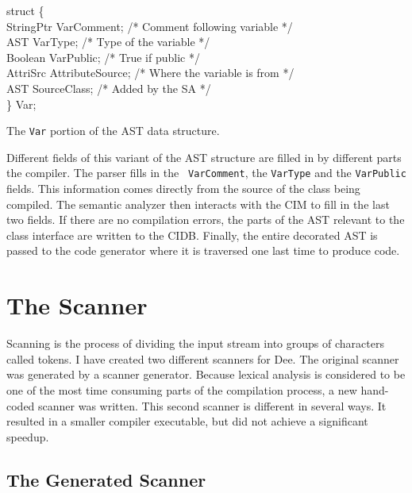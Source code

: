 \begin{shortfigure}
\begin{prog}  
\>      struct \{                     \\                                 
\>\>      StringPtr VarComment;     /* Comment following variable */  \\
\>\>      AST VarType;              /* Type of the variable       */  \\
\>\>      Boolean VarPublic;        /* True if public             */  \\
\>\>      AttriSrc AttributeSource; /* Where the variable is from */  \\
\>\>      AST SourceClass;          /* Added by the SA            */  \\
\>      \} Var;
\end{prog}
\caption{The {\tt Var} portion of the AST data structure.}
\label{fig:var}
\end{shortfigure}

Different fields of this variant of the AST structure are filled in by
different parts the compiler.  The parser fills in the {\tt
VarComment}, the {\tt VarType} and the {\tt VarPublic} fields.  This
information comes directly from the source of the class being
compiled.  The semantic analyzer then interacts with the CIM to fill
in the last two fields.  If there are no compilation errors, the parts
of the AST relevant to the class interface are written to the CIDB.
Finally, the entire decorated AST is passed to the code generator
where it is traversed one last time to produce code.


\section{The Scanner}

Scanning is the process of dividing the input stream into groups of
characters called tokens.  I have created two different scanners for
Dee.  The original scanner was generated by a scanner generator.
Because lexical analysis is considered to be one of the most time
consuming parts of the compilation process, a new hand-coded scanner
was written.  This second scanner is different in several ways.  It
resulted in a smaller compiler executable, but did not achieve a
significant speedup.

\subsection{The Generated Scanner}

